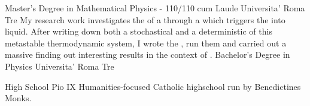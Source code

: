 \documentclass[9pt]{developercv} %
\newcommand{\myHilight}[2]{\tcbtp{\textit{\color{#1}{#2}}}}
\begin{document}
\vspace{-1.5em}


\begin{entrylist}
	\entry
		{}
		{Master's Degree in Mathematical Physics - 110/110 cum Laude}
		{Universita' Roma Tre}
		{My research work investigates the \myHilight{textcolor}{relaxation to the equilibrium} of a 
        \myHilight{textcolor}{supersaturated gas} through a \myHilight{textcolor}{critical droplet} 
        which triggers the \myHilight{textcolor}{phase transition} into liquid.
        \newline 
        After writing down both a stochastical and a deterministic \myHilight{textcolor}{mathematical model} 
        of this metastable thermodynamic system, 
        I wrote the \myHilight{textcolor}{C++ simulations}, run them and carried out a massive \myHilight{textcolor}{data analysis in Python} 
        finding out interesting results in the context of \myHilight{textcolor}{Non-Equilibrium Statistical Mechanics}.}
	\entry
		{}
		{Bachelor's Degree in Physics}
		{Universita' Roma Tre}

	\entry
		{}
		{High School}
		{Pio IX}
		{Humanities-focused Catholic highschool run by Benedictines Monks.}
\end{entrylist}

\end{document}

